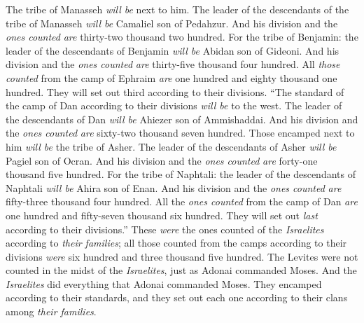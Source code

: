 \begin{biblechapter}
\verse The tribe of Manasseh \textit{will be} next to him. The leader of the descendants of the tribe of Manasseh \textit{will be} Camaliel son of Pedahzur.
\verse And his division and the \textit{ones counted} \textit{are} thirty-two thousand two hundred.
\verse For the tribe of Benjamin: the leader of the descendants of Benjamin \textit{will be} Abidan son of Gideoni.
\verse And his division and the \textit{ones counted} \textit{are} thirty-five thousand four hundred.
\verse All \textit{those counted} from the camp of Ephraim \textit{are} one hundred and eighty thousand one hundred. They will set out third according to their divisions.
\verse “The standard of the camp of Dan according to their divisions \textit{will be} to the west. The leader of the descendants of Dan \textit{will be} Ahiezer son of Ammishaddai.
\verse And his division and the \textit{ones counted} \textit{are} sixty-two thousand seven hundred.
\verse Those encamped next to him \textit{will be} the tribe of Asher. The leader of the descendants of Asher \textit{will be} Pagiel son of Ocran.
\verse And his division and the \textit{ones counted} \textit{are} forty-one thousand five hundred.
\verse For the tribe of Naphtali: the leader of the descendants of Naphtali \textit{will be} Ahira son of Enan.
\verse And his division and the \textit{ones counted} \textit{are} fifty-three thousand four hundred.
\verse All the \textit{ones counted} from the camp of Dan \textit{are} one hundred and fifty-seven thousand six hundred. They will set out \textit{last} according to their divisions.”
\verse These \textit{were} the ones counted of the \textit{Israelites} according to \textit{their families}; all those counted from the camps according to their divisions \textit{were} six hundred and three thousand five hundred.
\verse The Levites were not counted in the midst of the \textit{Israelites}, just as Adonai commanded Moses.
\verse And the \textit{Israelites} did everything that Adonai commanded Moses. They encamped according to their standards, and they set out each one according to their clans among \textit{their families}.
\end{biblechapter}

